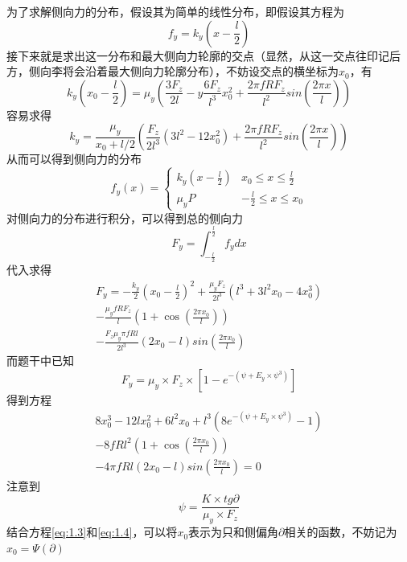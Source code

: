\documentclass[paper=a4, fontsize=11pt]{scrartcl} %
\numberwithin{equation}{section} %
\numberwithin{figure}{section} %
\numberwithin{table}{section} %
\begin{document}
为了求解侧向力的分布，假设其为简单的线性分布，即假设其方程为
\begin{equation}
f_y = k_y (x-\frac{l}{2})
\end{equation}
接下来就是求出这一分布和最大侧向力轮廓的交点（显然，从这一交点往印记后方，侧向李将会沿着最大侧向力轮廓分布），不妨设交点的横坐标为$x_0$，有
\begin{equation}
k_y (x_0-\frac{l}{2}) = \mu_y\left(\frac{3F_z}{2l} -y\frac{6F_z}{l^3}x_0^2 +\frac{2\pi fRF_z}{l^2}sin(\frac{2\pi x}{l})  \right)
\end{equation}
容易求得
\begin{equation}
k_y = \frac{\mu_y}{x_0 + l/2} \left( \frac{F_z}{2l^3}(3l^2 - 12x_0^2) + \frac{2\pi fRF_z}{l^2}sin(\frac{2\pi x}{l}) \right) 
\end{equation}
从而可以得到侧向力的分布
\begin{equation}
\label{eq:cepian}
f_y(x)=
\begin{cases}
k_y(x - \frac{l}{2})& \text{$x_0 \leq x \leq \frac{l}{2}$}\\
\mu_y P & \text{$-\frac{l}{2} \leq x \leq x_0$}
\end{cases}
\end{equation}
对侧向力的分布进行积分，可以得到总的侧向力
\begin{equation}
F_y = \int_{-\frac{l}{2}}^{\frac{l}{2}} f_y dx
\end{equation}
代入求得
\begin{equation}
\begin{split}
F_y = -\frac{k_y}{2}(x_0-\frac{l}{2})^2 + \frac{\mu_y F_z}{2l^3}(l^3+3l^2x_0-4x_0^3) \\ - \frac{\mu_y fRF_z}{l} \left(1 + \cos(\frac{2\pi x_0}{l}) \right) \\ -\frac{F_z\mu_y \pi fRl}{2l^3}(2x_0 - l)sin(\frac{2\pi x_0}{l})
\end{split}
\end{equation}
而题干中已知
\begin{equation}
F_y = \mu_y \times F_z \times \left[1-e^{-(\psi + E_y \times \psi^3)}\right]
\end{equation}
得到方程
\begin{equation} 
\label{eq:2.3}
\begin{split}
8x_0^3 -12lx_0^2 + 6l^2x_0 + l^3(8e^{-(\psi + E_y \times \psi^3)}-1) \\ -8fRl^2 \left(1+ \cos(\frac{2 \pi x_0}{l}) \right) \\-4\pi fRl(2x_0 -l)sin(\frac{2\pi x_0}{l}) = 0
\end{split}
\end{equation}
注意到
\begin{equation}
\label{eq:1.4}
\psi = \frac{K \times tg{\partial}}{\mu_y \times F_z}
\end{equation}
结合方程\ref{eq:1.3}和\ref{eq:1.4}，可以将$x_0$表示为只和侧偏角$\partial$相关的函数，不妨记为$x_0 = \Psi(\partial)$
\end{document}
